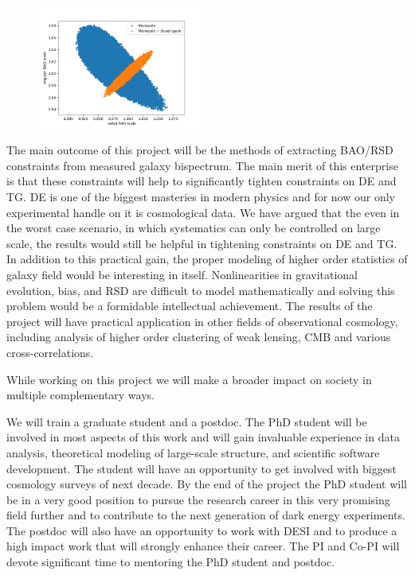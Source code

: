 
\begin{figure}
\begin{center}
\includegraphics[width=0.48\textwidth]{prelimMCMC.png}
\end{center}
\end{figure}
The main outcome of this project will be the methods of extracting BAO/RSD
constraints from measured galaxy bispectrum. The main merit of this enterprise
is that these constraints will help to significantly tighten constraints on DE
and TG. DE is one of the biggest masteries in modern physics and for now our
only experimental handle on it is cosmological data. We have argued that the
even in the worst case scenario, in which systematics can only be controlled on
large scale, the results would still be helpful in tightening constraints on DE
and TG. In addition to this practical gain, the proper modeling of higher order
statistics of galaxy field would be interesting in itself. Nonlinearities in
gravitational evolution, bias, and RSD are difficult to model mathematically
and solving this problem would be a formidable intellectual achievement. The
results of the project will have practical application in other fields of
observational cosmology, including analysis of higher order clustering of weak
lensing, CMB and various cross-correlations.


While working on this project we will make a broader impact on society in
multiple complementary ways.

We will train a graduate student and a postdoc. The PhD student will be
involved in most aspects of this work and will gain invaluable experience in
data analysis, theoretical modeling of large-scale structure, and scientific
software development. The student will have an opportunity to get involved with
biggest cosmology surveys of next decade. By the end of the project the PhD
student will be in a very good position to pursue the research career in this
very promising field further and to contribute to the next generation of dark
energy experiments. The postdoc will also have an opportunity to work with DESI
and to produce a high impact work that will strongly enhance their career. The
PI and Co-PI will devote significant time to mentoring the PhD student and
postdoc.

